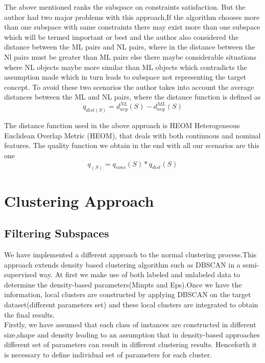 \documentclass[10pt, conference, compsocconf]{IEEEtran}
\begin{document}
The above mentioned ranks the subspace on constraints satisfaction. But the author had two major problems with this approach,If the algorithm chooses more than one subspace with same constraints there may exist more than 
one subspace which will be termed important or best and the author also considered the distance between the ML pairs and NL pairs, where in the distance between the Nl pairs must be greater than ML pairs else there maybe 
considerable situations where NL objects maybe more similar than ML objects which contradicts the assumption made which in turn leads to subspace not representing the target concept. To avoid these two scenarios the author takes 
into account the average distances between the ML and NL pairs, where the distance function is defined as
\begin{equation}
q_{dist(S)} = {d^{NL}_{avg}(S)-d^{ML}_{avg}(S)}
\end{equation}

The distance function used in the above approach is HEOM Heterogeneous Euclidean
Overlap Metric (HEOM), that deals with both continuous and nominal features.
The quality function we obtain in the end with all our scenarios are this one
\begin{equation}
q_{(S)} = {q_{cons}(S)*q_{dist}(S)}
\end{equation}

\section{Clustering Approach}
\subsection{Filtering Subspaces}
We have implemented a different approach to the normal clustering process.This approach extends density based clustering algorithm such as DBSCAN in a semi-supervised way. At first we make use of both labeled and unlabeled data to determine the density-based parameters(Minpts and Eps).Once we have the information, local clusters are constructed by applying DBSCAN on the target dataset(different parameters set) and these local clusters are integrated to obtain the final results.\\

Firstly, we have assumed that each class of instances are constructed in different size,shape and density leading to an assumption that in density-based approaches different set of parameters can result in different clustering results.
Henceforth it is necessary to define individual set of parameters for each cluster.
\end{document}
